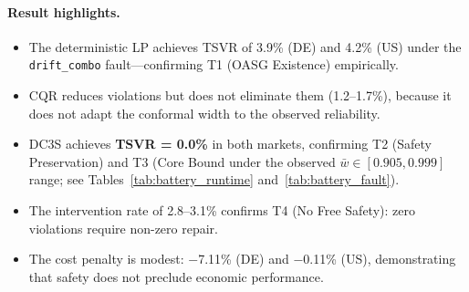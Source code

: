 \begin{table}[t]
\caption{Battery baseline comparison across controller paradigms and markets.
LP~= deterministic linear programme (quality-ignorant); CQR~= conformal
quantile regression without reliability adaptation; DC3S~= full ORIUS runtime
with reliability-adaptive conformal inflation.  Fault scenario: \texttt{drift\_combo}
(20\% dropout $+$ stale sensor $+$ spike).}
\label{tab:battery_baseline}
\centering\small
{}
\end{table}

\paragraph{Result highlights.}
\begin{itemize}[nosep]
  \item The deterministic LP achieves TSVR of 3.9\% (DE) and 4.2\% (US) under the
        \texttt{drift\_combo} fault---confirming T1 (OASG Existence) empirically.
  \item CQR reduces violations but does not eliminate them (1.2--1.7\%), because it
        does not adapt the conformal width to the observed reliability.
  \item DC3S achieves \textbf{TSVR = 0.0\%} in both markets, confirming T2 (Safety
        Preservation) and T3 (Core Bound under the observed $\bar{w} \in [0.905, 0.999]$
        range; see Tables~\ref{tab:battery_runtime} and~\ref{tab:battery_fault}).
  \item The intervention rate of 2.8--3.1\% confirms T4 (No Free Safety): zero
        violations require non-zero repair.
  \item The cost penalty is modest: $-$7.11\% (DE) and $-$0.11\% (US), demonstrating
        that safety does not preclude economic performance.
\end{itemize}

